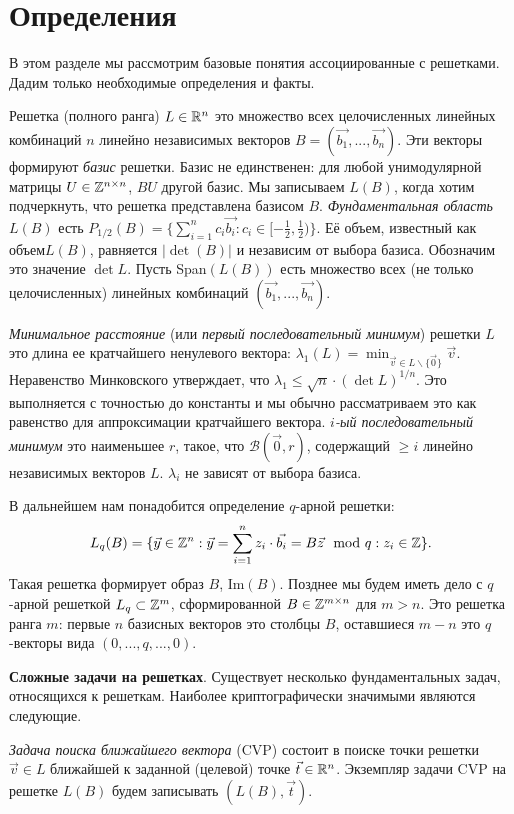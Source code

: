 \documentclass[a4paper,11pt]{article}
\begin{document}
\section{Определения}

В этом разделе мы рассмотрим базовые понятия ассоциированные с решетками. Дадим только необходимые определения и факты.

Решетка (полного ранга) $L \in {{\mathbb R}}^n$ это множество всех целочисленных линейных комбинаций $n$ линейно независимых векторов $B = {(\vec{b_1},...,\vec{b_n})}$. Эти векторы формируют \emph{базис} решетки. Базис не единственен: для любой унимодулярной матрицы $U \in {{\mathbb Z}}^{n \times n}$, $BU$ другой базис. Мы записываем $L(B)$, когда хотим подчеркнуть, что решетка представлена базисом $B$. \emph{Фундаментальная область} $L(B)$ есть $P_{1/2}(B) = \{\sum_{i = 1}^n c_i \vec{b_i} : c_i \in {[-\frac{1}{2},\frac{1}{2})}\}$. Её объем, известный как объем$L(B)$, равняется $|\det(B)|$  и независим от выбора базиса. Обозначим это значение $\det L$. Пусть Span$(L(B))$ есть множество всех (не только целочисленных) линейных комбинаций $(\vec{b_1},...,\vec{b_n})$.

\emph{Минимальное расстояние} (или \emph{первый последовательный минимум}) решетки $L$ это длина ее кратчайшего ненулевого вектора: $\lambda_1 (L) = \min_{\vec{v} \in L \backslash \{\vec{0}\}} \vec{v}$. Неравенство Минковского утверждает, что $\lambda_1 \leq \sqrt{n} \cdot (\det{L})^{1/n}$. Это выполняется с точностью до константы и мы обычно рассматриваем это как равенство для аппроксимации кратчайшего вектора. \emph{$i$-ый последовательный минимум} это наименьшее $r$, такое, что $\mathcal{B}(\vec{0}, r)$, содержащий $\geq i$ линейно независимых векторов $L$. $\lambda_i$ не зависят от выбора базиса.

В дальнейшем нам понадобится определение $q$-арной решетки:
\[
	L_q(B) = \{ \vec{y} \in {{\mathbb Z}}^n : \vec{y} = \sum_{i = 1}^n z_i \cdot \vec{b_i} = B\vec{z} \mod q : z_i \in {{\mathbb Z}} \}.
\]
Такая решетка формирует образ $B$, Im$(B)$. Позднее мы будем иметь дело с $q$-арной решеткой $L_q \subset {{\mathbb Z}}^m$, сформированной $B \in {{\mathbb Z}}^{m \times n}$ для $m > n$. Это решетка ранга $m$: первые $n$ базисных векторов это столбцы $B$, оставшиеся $m-n$ это $q$-векторы вида $(0,...,q,...,0)$.

\textbf{Сложные задачи на решетках}. Существует несколько фундаментальных задач, относящихся к решеткам. Наиболее криптографически значимыми являются следующие.

\emph{Задача поиска ближайшего вектора} (CVP) состоит в поиске точки решетки $\vec{v} \in L$ ближайшей к заданной (целевой) точке $\vec{t} \in {{\mathbb R}}^n$. Экземпляр задачи CVP на решетке $L(B)$ будем записывать $(L(B), \vec{t})$.
\end{document}
